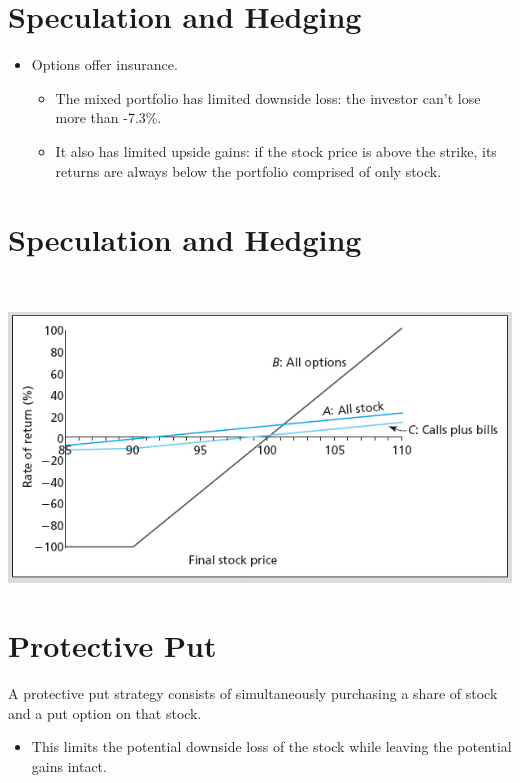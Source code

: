 \documentclass[letterpaper,10pt,english]{sphinxmanual}
\begin{document}
\section{Speculation and Hedging}
\label{options:id16}\begin{itemize}
\item {} 
Options offer insurance.
\begin{itemize}
\item {} 
The mixed portfolio has limited downside loss: the investor can't
lose more than -7.3\%.

\end{itemize}
\begin{itemize}
\item {} 
It also has limited upside gains: if the stock price is above the
strike, its returns are always below the portfolio comprised of
only stock.

\end{itemize}

\end{itemize}


\section{Speculation and Hedging}
\label{options:id17}
$\qquad$

\includegraphics[width=6in]{bod34698_1505_lg.jpg}


\section{Protective Put}
\label{options:protective-put}
A protective put strategy consists of simultaneously purchasing a
share of stock and a put option on that stock.
\begin{itemize}
\item {} 
This limits the potential downside loss of the stock while leaving
the potential gains intact.

\end{itemize}
\end{document}
